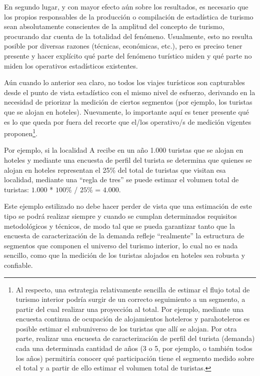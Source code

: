 \documentclass[
  openany]{book}
\begin{document}
En segundo lugar, y con mayor efecto aún sobre los resultados, es necesario que los propios responsables de la producción o compilación de estadística de turismo sean absolutamente conscientes de la amplitud del concepto de turismo, procurando dar cuenta de la totalidad del fenómeno. Usualmente, esto no resulta posible por diversas razones (técnicas, económicas, etc.), pero es preciso tener presente y hacer explícito qué parte del fenómeno turístico miden y qué parte no miden los operativos estadísticos existentes.

Aún cuando lo anterior sea claro, no todos los viajes turísticos son capturables desde el punto de vista estadístico con el mismo nivel de esfuerzo, derivando en la necesidad de priorizar la medición de ciertos segmentos (por ejemplo, los turistas que se alojan en hoteles). Nuevamente, lo importante aquí es tener presente qué es lo que queda por fuera del recorte que el/los operativo/s de medición vigentes proponen\footnote{Al respecto, una estrategia relativamente sencilla de estimar el flujo total de turismo interior podría surgir de un correcto seguimiento a un segmento, a partir del cual realizar una proyección al total. Por ejemplo, mediante una encuesta continua de ocupación de alojamientos hoteleros y parahoteleros es posible estimar el subuniverso de los turistas que allí se alojan. Por otra parte, realizar una encuesta de caracterización de perfil del turista (demanda) cada una determinada cantidad de años (3 o 5, por ejemplo, o también todos los años) permitiría conocer qué participación tiene el segmento medido sobre el total y a partir de ello estimar el volumen total de turistas.}.

Por ejemplo, si la localidad A recibe en un año 1.000 turistas que se alojan en hoteles y mediante una encuesta de perfil del turista se determina que quienes se alojan en hoteles representan el 25\% del total de turistas que visitan esa localidad, mediante una ``regla de tres'' se puede estimar el volumen total de turistas: \(1.000\) * \(100\%\) / \(25\%\) = \(4.000\).

Este ejemplo estilizado no debe hacer perder de vista que una estimación de este tipo se podrá realizar siempre y cuando se cumplan determinados requisitos metodológicos y técnicos, de modo tal que se pueda garantizar tanto que la encuesta de caracterización de la demanda refleje ``realmente'' la estructura de segmentos que componen el universo del turismo interior, lo cual no es nada sencillo, como que la medición de los turistas alojados en hoteles sea robusta y confiable.
\end{document}
